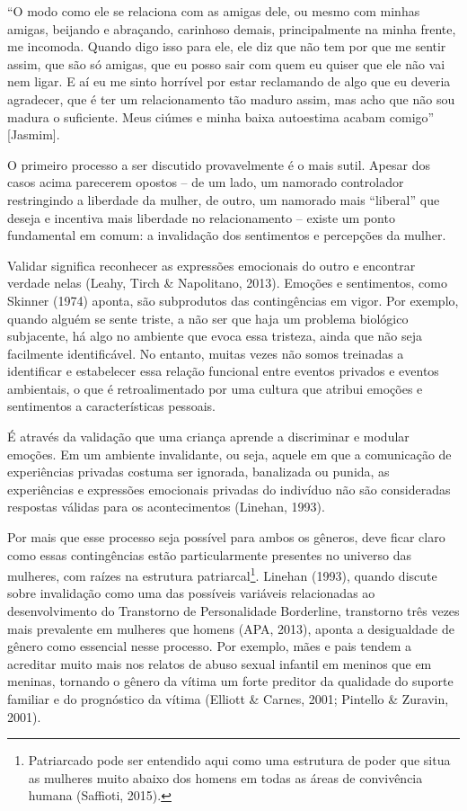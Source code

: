 ``O modo como ele se relaciona com as amigas dele, ou mesmo com minhas amigas, beijando e abraçando, carinhoso demais, principalmente na minha frente, me incomoda. Quando digo isso para ele, ele diz que não tem por que me sentir assim, que são só amigas, que eu posso sair com quem eu quiser que ele não vai nem ligar. E aí eu me sinto horrível por estar reclamando de algo que eu deveria agradecer, que é ter um relacionamento tão maduro assim, mas acho que não sou madura o suficiente. Meus ciúmes e minha baixa autoestima acabam comigo'' [Jasmim].

O primeiro processo a ser discutido provavelmente é o mais sutil. Apesar dos casos acima parecerem opostos – de um lado, um namorado controlador restringindo a liberdade da mulher, de outro, um namorado mais ``liberal'' que deseja e incentiva mais liberdade no relacionamento – existe um ponto fundamental em comum: a invalidação dos sentimentos e percepções da mulher.

Validar significa reconhecer as expressões emocionais do outro e encontrar verdade nelas (Leahy, Tirch \& Napolitano, 2013). Emoções e sentimentos, como Skinner (1974) aponta, são subprodutos das contingências em vigor. Por exemplo, quando alguém se sente triste, a não ser que haja um problema biológico subjacente, há algo no ambiente que evoca essa tristeza, ainda que não seja facilmente identificável. No entanto, muitas vezes não somos treinadas a identificar e estabelecer essa relação funcional entre eventos privados e eventos ambientais, o que é retroalimentado por uma cultura que atribui emoções e sentimentos a características pessoais.

É através da validação que uma criança aprende a discriminar e modular emoções. Em um ambiente invalidante, ou seja, aquele em que a comunicação de experiências privadas costuma ser ignorada, banalizada ou punida, as experiências e expressões emocionais privadas do indivíduo não são consideradas respostas válidas para os acontecimentos (Linehan, 1993).

Por mais que esse processo seja possível para ambos os gêneros, deve ficar claro como essas contingências estão particularmente presentes no universo das mulheres, com raízes na estrutura patriarcal\footnote{Patriarcado pode ser entendido aqui como uma estrutura de poder que situa as mulheres muito abaixo dos homens em todas as áreas de convivência humana (Saffioti, 2015).}. Linehan (1993), quando discute sobre invalidação como uma das possíveis variáveis relacionadas ao desenvolvimento do Transtorno de Personalidade Borderline, transtorno três vezes mais prevalente em mulheres que homens (APA, 2013), aponta a desigualdade de gênero como essencial nesse processo. Por exemplo, mães e pais tendem a acreditar muito mais nos relatos de abuso sexual infantil em meninos que em meninas, tornando o gênero da vítima um forte preditor da qualidade do suporte familiar e do prognóstico da vítima (Elliott \& Carnes, 2001; Pintello \& Zuravin, 2001).

